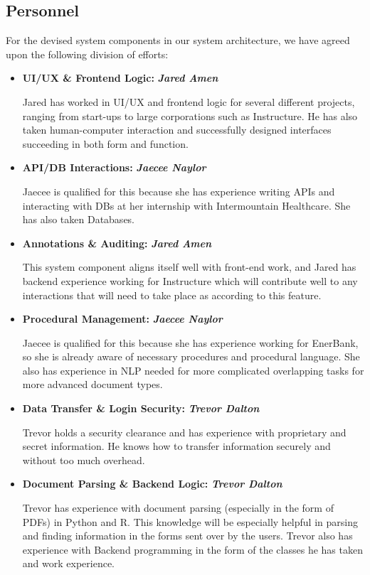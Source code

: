 \subsection{Personnel}

For the devised system components in our system architecture, we have agreed upon the following division of efforts:

\begin{itemize}
    \item \textbf{UI/UX \& Frontend Logic:} \textbf{\textit{Jared Amen}}
    
    Jared has worked in UI/UX and frontend logic for several different projects, ranging from start-ups to large corporations such as Instructure. He has also taken human-computer interaction and successfully designed interfaces succeeding in both form and function.
    
    \item \textbf{API/DB Interactions:} \textbf{\textit{Jaecee Naylor}}
    
    Jaecee is qualified for this because she has experience writing APIs and interacting with DBs at her internship with Intermountain Healthcare. She has also taken Databases.
    
    \item \textbf{Annotations \& Auditing:} \textbf{\textit{Jared Amen}}
    
    This system component aligns itself well with front-end work, and Jared has backend experience working for Instructure which will contribute well to any interactions that will need to take place as according to this feature. 
    
    \item \textbf{Procedural Management:} \textbf{\textit{Jaecee Naylor}}
    
    Jaecee is qualified for this because she has experience working for EnerBank, so she is already aware of necessary procedures and procedural language. She also has experience in NLP needed for more complicated overlapping tasks for more advanced document types.
    
    \item \textbf{Data Transfer \& Login Security:} \textbf{\textit{Trevor Dalton}}
    
    Trevor holds a security clearance and has experience with proprietary and secret information. He knows how to transfer information securely and without too much overhead.
    
    \item \textbf{Document Parsing \& Backend Logic:} \textbf{\textit{Trevor Dalton}}
    
    Trevor has experience with document parsing (especially in the form of PDFs) in Python and R. This knowledge will be especially helpful in parsing and finding information in the forms sent over by the users. Trevor also has experience with Backend programming in the form of the classes he has taken and work experience.
\end{itemize}